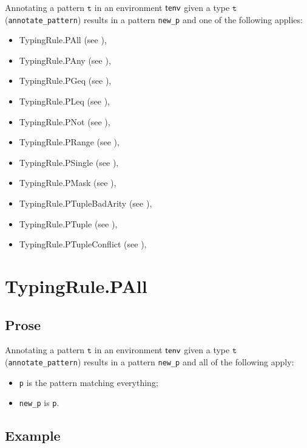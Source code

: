 \documentclass{book}
\newcommand\vt[0]{\texttt{t}}
\begin{document}
Annotating a pattern $\vt$ in an environment $\textsf{tenv}$ given a type $\vt$ (\texttt{annotate\_pattern}) results in a pattern \texttt{new\_p} and one of the following applies:
\begin{itemize}
\item TypingRule.PAll (see ),
\item TypingRule.PAny (see ),
\item TypingRule.PGeq (see ),
\item TypingRule.PLeq (see ),
\item TypingRule.PNot (see ),
\item TypingRule.PRange (see ),
\item TypingRule.PSingle (see ),
\item TypingRule.PMask (see ),
\item TypingRule.PTupleBadArity (see ),
\item TypingRule.PTuple (see ),
\item TypingRule.PTupleConflict (see ),
\end{itemize}

\section{TypingRule.PAll \label{sec:TypingRule.PAll}}

  \subsection{Prose}
   Annotating a pattern $\vt$ in an environment $\textsf{tenv}$ given a type $\vt$ (\texttt{annotate\_pattern}) results in a pattern \texttt{new\_p} and all of the following apply:
   \begin{itemize}
   \item \texttt{p} is the pattern matching everything;
   \item \texttt{new\_p} is \texttt{p}.
   \end{itemize}

  \subsection{Example}


\end{document}
